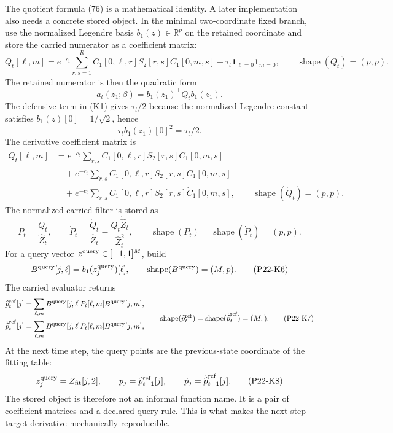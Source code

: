 \documentclass[11pt]{article}
\newcommand{\R}{\mathbb R}
\newcommand{\ind}{\mathbf 1}
\newcommand{\shape}{\operatorname{shape}}
\begin{document}
The quotient formula (76) is a mathematical identity.  A later implementation
also needs a concrete stored object.  In the minimal two-coordinate fixed
branch, use the normalized Legendre basis \(b_1(z)\in\R^p\) on the retained
coordinate and store the carried numerator as a coefficient matrix:
\[
    Q_t[\ell,m]
    =
    e^{-c_t}\sum_{r,s=1}^{R}
    C_1[0,\ell,r]S_2[r,s]C_1[0,m,s]
    +\tau_t\ind_{\ell=0}\ind_{m=0},
    \qquad
    \shape(Q_t)=(p,p).
    \tag{P22-K1}
\]
The retained numerator is then the quadratic form
\[
    a_t(z_1;\beta)=b_1(z_1)^\top Q_t b_1(z_1).
    \tag{P22-K2}
\]
The defensive term in (K1) gives \(\tau_t/2\) because the normalized Legendre
constant satisfies \(b_1(z)[0]=1/\sqrt2\), hence
\[
    \tau_t b_1(z_1)[0]^2=\tau_t/2.
    \tag{P22-K3}
\]
The derivative coefficient matrix is
\[
\begin{aligned}
    \dot Q_t[\ell,m]
    &=
    e^{-c_t}\sum_{r,s}
    \dot C_1[0,\ell,r]S_2[r,s]C_1[0,m,s]\\
    &\quad+
    e^{-c_t}\sum_{r,s}
    C_1[0,\ell,r]\dot S_2[r,s]C_1[0,m,s]\\
    &\quad+
    e^{-c_t}\sum_{r,s}
    C_1[0,\ell,r]S_2[r,s]\dot C_1[0,m,s],
    \qquad
    \shape(\dot Q_t)=(p,p).
\end{aligned}
\tag{P22-K4}
\]
The normalized carried filter is stored as
\[
    P_t=\frac{Q_t}{\widehat Z_t},
    \qquad
    \dot P_t=
    \frac{\dot Q_t}{\widehat Z_t}
    -
    \frac{Q_t\dot{\widehat Z}_t}{\widehat Z_t^2},
    \qquad
    \shape(P_t)=\shape(\dot P_t)=(p,p).
    \tag{P22-K5}
\]
For a query vector \(z^{\rm query}\in[-1,1]^M\), build
\[
    B^{\rm query}[j,\ell]=b_1(z^{\rm query}_j)[\ell],
    \qquad
    \shape(B^{\rm query})=(M,p).
    \tag{P22-K6}
\]
The carried evaluator returns
\[
\begin{aligned}
    \widehat p_t^{\rm ref}[j]
    &=
    \sum_{\ell,m}
    B^{\rm query}[j,\ell]P_t[\ell,m]B^{\rm query}[j,m],\\
    \dot{\widehat p}_t^{\rm ref}[j]
    &=
    \sum_{\ell,m}
    B^{\rm query}[j,\ell]\dot P_t[\ell,m]B^{\rm query}[j,m],
\end{aligned}
\qquad
\shape(\widehat p_t^{\rm ref})
=
\shape(\dot{\widehat p}_t^{\rm ref})
=(M,).
\tag{P22-K7}
\]
At the next time step, the query points are the previous-state coordinate of
the fitting table:
\[
    z^{\rm query}_j=Z_{\rm fit}[j,2],
    \qquad
    p_j=\widehat p_{t-1}^{\rm ref}[j],
    \qquad
    \dot p_j=\dot{\widehat p}_{t-1}^{\rm ref}[j].
    \tag{P22-K8}
\]
The stored object is therefore not an informal function name.  It is a pair of
coefficient matrices and a declared query rule.  This is what makes the
next-step target derivative mechanically reproducible.
\end{document}
